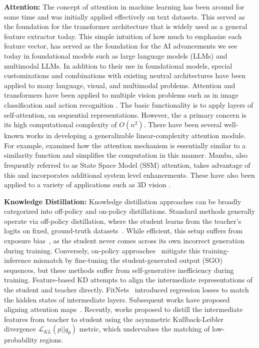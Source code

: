 \noindent\textbf{Attention:} The concept of attention in machine learning has been around for some time \cite{bahdanau2014neural} and was initially applied effectively on text datasets. This served as the foundation for the transformer architecture \cite{vaswani2017attention} that is widely used as a general feature extractor today. This simple intuition of how much to emphasize each feature vector, has served as the foundation for the AI advancements we see today in foundational models such as large language models (LLMs) and multimodal LLMs. In addition to their use in foundational models, special customizations and combinations with existing neutral architectures have been applied to many language, visual, and multimodal problems. 
Attention and transformers have been applied to multiple vision problems such as in image classification \cite{dosovitskiy2020vit} and action recognition \cite{nagrani2021attention}. The basic functionality is to apply layers of self-attention, on sequential representations. However, the a primary concern is its high computational complexity of $O(n^2)$. There have been several well-known works in developing a generalizable linear-complexity attention module. For example, \cite{katharopoulos2020transformers} examined how the attention mechanism is essentially similar to a similarity function and simplifies the computation in this manner. Mamba\cite{gu2023mamba}, also frequently referred to as State Space Model (SSM) attention, takes advantage of this and incorporates additional system level enhancements. These have also been applied to a variety of applications such as 3D vision \cite{ke2025mambev}.

\noindent\textbf{Knowledge Distillation: } Knowledge distillation approaches can be broadly categorized into off-policy and on-policy distillations. 
Standard methods generally operate via off-policy distillation, where the student learns from the teacher's logits on fixed, ground-truth datasets~\cite{hinton2015distilling,sanh2019distilbert,wu2024rethinking,kim2016sequence,wen2023f}.
While efficient, this setup suffers from exposure bias~\cite{arora2022exposure}, as the student never comes across its own incorrect generation during training.
Conversely, on-policy approaches~\cite{agarwal2024onpolicy,gu2024minillm,ko2024distillm,kodistillm} mitigate this training-inference mismatch by fine-tuning the student-generated output (SGO) sequences, but these methods suffer from self-generative inefficiency during training. Feature-based KD attempts to align the intermediate representations of the student and teacher directly. 
FitNets~\cite{romero2014fitnets} introduced regression losses to match the hidden states of intermediate layers. Subsequent works have proposed aligning attention maps~\cite{zagoruyko2017paying,wang2020minilm}.
Recently, works \cite{sun2019patient, gong2025beyond} proposed to distill the intermediate features from teacher to student using the asymmetric Kullback-Leibler divergence $\mathcal{L}_{KL}(p||q_\theta)$ metric, which undervalues the matching of low-probability regions.

